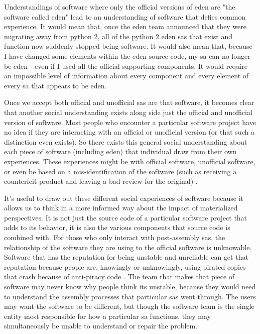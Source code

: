 \documentclass[a4paper,man,natbib,floatsintext]{apa6}
\begin{document}
   Understandings of software where only the official versions of \acrshort{eden} are "the software called \acrshort{eden}" lead to an understanding of software that defies common experience. It would mean that, once the \acrshort{eden} team announced that they were migrating away from \gls{python} 2, all of the \gls{python} 2 \acrshort{eden} \glspl{sa} that exist and function now suddenly stopped being software. It would also mean that, because I have changed some elements within the \acrshort{eden} source code, my \gls{sa} can no longer be \acrshort{eden} - even if I used all the official supporting components. It would require an impossible level of information about every component and every element of every \gls{sa} that appears to be \acrshort{eden}.

   Once we accept both official and unofficial \glspl{sa} are that software, it becomes clear that another social understanding exists along side just the official and unofficial version of software. Most people who encounter a particular software project have no idea if they are interacting with an official or unofficial version (or that such a distinction even exists). So there exists this general social understanding about each piece of software (including \acrshort{eden}) that individual draw from their own experiences. These experiences might be with official software, unofficial software, or even be based on a mis-identification of the software (such as receiving a counterfeit product and leaving a bad review for the original) \citep{Suthivarakom2020-cp}.

   It's useful to draw out these different social experiences of software because it allows us to think in a more informed way about the impact of materialized perspectives. It is not just the source code of a particular software project that adds to its behavior, it is also the various components that source code is combined with. For those who only interact with post-assembly \glspl{sa}, the relationship of the software they are using to the official software is unknowable. Software that has the reputation for being unstable and unreliable can get that reputation because people are, knowingly or unknowingly, using pirated copies that crash because of anti-piracy code \citep{Fitch2008-vq}. The team that makes that piece of software may never know why people think its unstable, because they would need to understand the assembly processes that particular \glspl{sa} went through. The users may want the software to be different, but though the software team is the single entity most responsible for how a particular \gls{sa} functions, they may simultaneously be unable to understand or repair the problem.
\end{document}
